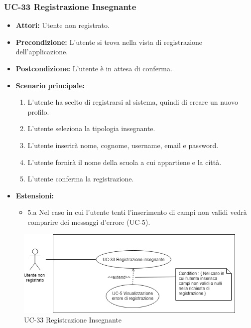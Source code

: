 \subsubsection{UC-33 Registrazione Insegnante}
\begin{itemize}
	\item \textbf{Attori: }Utente non registrato.
	\item \textbf{Precondizione: }L'utente si trova nella vista di registrazione dell'applicazione.
	\item \textbf{Postcondizione: }L'utente è in attesa di conferma.
	\item \textbf{Scenario principale: }
	\begin{enumerate}
		\item L'utente ha scelto di registrarsi al sistema, quindi di creare un nuovo profilo. 
		\item L'utente seleziona la tipologia insegnante. 
		\item L'utente inserirà nome, cognome, username, email e password.
		\item L'utente fornirà il nome della scuola a cui appartiene e la città.
		\item L'utente conferma la registrazione.
	\end{enumerate}
	\item \textbf{Estensioni: }
	\begin{itemize}
		\item 5.a Nel caso in cui l'utente tenti l'inserimento di campi non validi vedrà comparire dei messaggi d'errore (UC-5).
	\end{itemize}
\end{itemize}
\begin{figure}[h]
	\centering
	\includegraphics[scale=0.7]{images/UC-1i.png}
	\caption{UC-33 Registrazione Insegnante}
\end{figure}	

